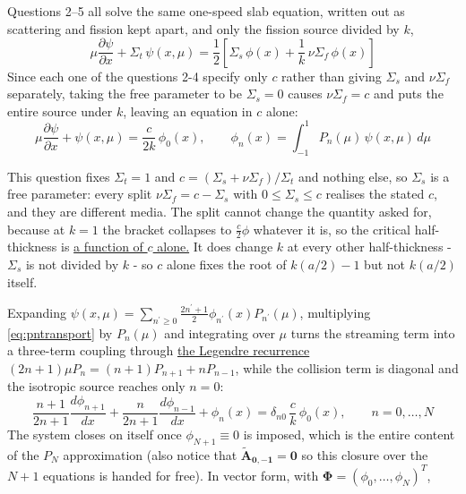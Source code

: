 \documentclass[11pt]{article}
\begin{document}
Questions 2--5 all solve the same one-speed slab equation, written out as scattering and fission kept apart, and only the fission
source divided by $k$,
\begin{equation}
    \mu\frac{\partial \psi}{\partial x} + \Sigma_t\,\psi(x,\mu)
    = \frac{1}{2}\left[\Sigma_s\,\phi(x) + \frac{1}{k}\,\nu\Sigma_f\,\phi(x)\right] \label{eq:slab-eq}
\end{equation}
Since each one of the questions 2-4 specify only $c$ rather than giving $\Sigma_s$ and $\nu\Sigma_f$ separately, taking the free parameter to be $\Sigma_s=0$ causes $\nu\Sigma_f=c$ and puts the entire source under $k$, leaving an equation in $c$ alone:
\begin{equation}
    \mu\frac{\partial \psi}{\partial x} + \psi(x,\mu) = \frac{c}{2k}\,\phi_0(x),
    \qquad \phi_n(x) = \int_{-1}^{1} P_n(\mu)\,\psi(x,\mu)\,d\mu
    \label{eq:pntransport}
\end{equation}
\begin{notebox}
This question fixes $\Sigma_t=1$ and $c=(\Sigma_s+\nu\Sigma_f)/\Sigma_t$ and
nothing else, so $\Sigma_s$ is a free parameter: every split $\nu\Sigma_f = c-\Sigma_s$ with
$0\le\Sigma_s\le c$ realises the stated $c$, and they are different media. The split cannot
change the quantity asked for, because at $k=1$ the bracket collapses to $\tfrac{c}{2}\phi$
whatever it is, so the critical half-thickness is \uline{a function of $c$ alone.} It does change $k$
at every other half-thickness - $\Sigma_s$ is not divided by $k$ - so $c$ alone fixes the
root of $k(a/2)-1$ but not $k(a/2)$ itself. 
\end{notebox}
Expanding $\psi(x,\mu)=\sum_{n^\prime\ge0}\frac{2n^\prime+1}{2}\phi_{n^\prime}(x)P_{n^\prime}(\mu)$, multiplying
\eqref{eq:pntransport} by $P_n(\mu)$ and integrating over $\mu$ turns the streaming term into
a three-term coupling through \uline{the Legendre recurrence}
$(2n+1)\mu P_n = (n+1)P_{n+1} + n P_{n-1}$, while the collision term is diagonal and the
isotropic source reaches only $n=0$:
\begin{equation}
    \frac{n+1}{2n+1}\frac{d\phi_{n+1}}{dx} + \frac{n}{2n+1}\frac{d\phi_{n-1}}{dx}
    + \phi_n(x) = \delta_{n0}\,\frac{c}{k}\,\phi_0(x),
    \qquad n=0,\dots,N
    \label{eq:pnrec}
\end{equation}
The system closes on itself once $\phi_{N+1}\equiv 0$ is imposed, which is the entire content
of the $P_N$ approximation (also notice that $\mathbf{\tilde A_{0,-1}=0}$ so this closure over the $N+1$ equations is handed for free). In vector form, with $\boldsymbol{\Phi}=(\phi_0,\dots,\phi_N)^{T}$,
\end{document}
